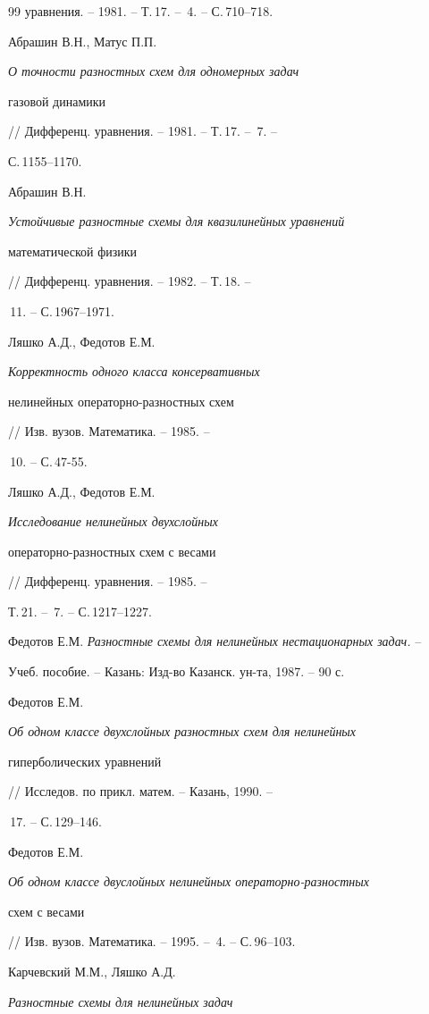 \begin{thebibliography}{99}
уравнения. -- 1981. -- Т.\,17. -- \No\,4. -- С.\,710--718. 




Абрашин В.Н., Матус П.П. {\em О точности разностных схем для одномерных задач 


газовой динамики} // Дифференц. уравнения. -- 1981. -- Т.\,17. -- \No\,7. -- 


С.\,1155--1170. 




Абрашин В.Н. {\em Устойчивые разностные схемы для квазилинейных уравнений 


математической физики} // Дифференц. уравнения. -- 1982. -- Т.\,18. -- 


\No\,11. -- С.\,1967--1971. 




Ляшко А.Д., Федотов Е.М. {\em Корректность одного класса консервативных 


нелинейных операторно-разностных схем} // Изв. вузов. Математика. -- 1985. -- 


\No\,10. -- С.\,47-55. 




Ляшко А.Д., Федотов Е.М. {\em Исследование нелинейных двухслойных 


операторно-разностных схем с весами} // Дифференц. уравнения. -- 1985. -- 


Т.\,21. -- \No\,7. -- С.\,1217--1227. 




Федотов Е.М. {\em Разностные схемы для нелинейных нестационарных задач.} -- 


Учеб. пособие. -- Казань: Изд-во Казанск. ун-та, 1987. -- 90 с. 




Федотов Е.М. {\em Об одном классе двухслойных разностных схем для нелинейных 


гиперболических уравнений} // Исследов. по прикл. матем. -- Казань, 1990. -- 


\No\,17. -- С.\,129--146. 




Федотов Е.М. {\em Об одном классе двуслойных нелинейных операторно-разностных 


схем с весами} // Изв. вузов. Математика. -- 1995. -- \No\,4. -- С.\,96--103. 




Карчевский М.М., Ляшко А.Д. {\em Разностные схемы для нелинейных задач 


}
\end{thebibliography}
